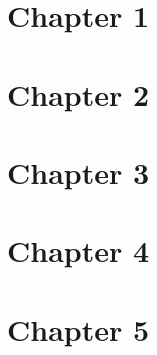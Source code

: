 \documentclass{article}
\theoremstyle{definition}
\begin{document}

\section{Chapter 1}





\section{Chapter 2}





\section{Chapter 3}

\newpage

\newpage

\newpage
\section{Chapter 4}




\section{Chapter 5}



\end{document}
